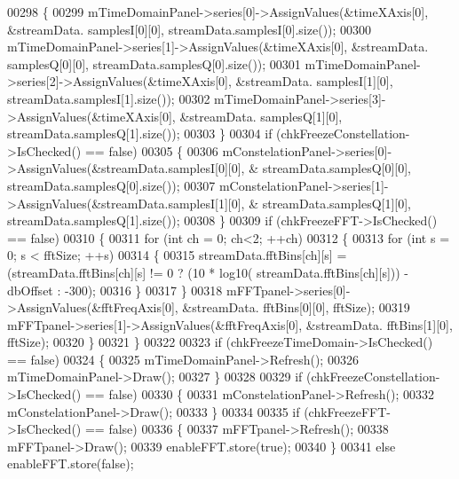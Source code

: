 \begin{DoxyCode}
{{{00298         \{
00299             mTimeDomainPanel->series[0]->AssignValues(&timeXAxis[0], &streamData.
      samplesI[0][0], streamData.samplesI[0].size());
00300             mTimeDomainPanel->series[1]->AssignValues(&timeXAxis[0], &streamData.
      samplesQ[0][0], streamData.samplesQ[0].size());
00301             mTimeDomainPanel->series[2]->AssignValues(&timeXAxis[0], &streamData.
      samplesI[1][0], streamData.samplesI[1].size());
00302             mTimeDomainPanel->series[3]->AssignValues(&timeXAxis[0], &streamData.
      samplesQ[1][0], streamData.samplesQ[1].size());
00303         \}
00304         \textcolor{keywordflow}{if} (chkFreezeConstellation->IsChecked() == \textcolor{keyword}{false})
00305         \{
00306             mConstelationPanel->series[0]->AssignValues(&streamData.samplesI[0][0], &
      streamData.samplesQ[0][0], streamData.samplesQ[0].size());
00307             mConstelationPanel->series[1]->AssignValues(&streamData.samplesI[1][0], &
      streamData.samplesQ[1][0], streamData.samplesQ[1].size());
00308         \}
00309         \textcolor{keywordflow}{if} (chkFreezeFFT->IsChecked() == \textcolor{keyword}{false})
00310         \{
00311             \textcolor{keywordflow}{for} (\textcolor{keywordtype}{int} ch = 0; ch<2; ++ch)
00312             \{
00313                 \textcolor{keywordflow}{for} (\textcolor{keywordtype}{int} s = 0; s < fftSize; ++s)
00314                 \{
00315                     streamData.fftBins[ch][s] = (streamData.fftBins[ch][s] != 0 ? (10 * log10(
      streamData.fftBins[ch][s])) - dbOffset : -300);
00316                 \}
00317             \}
00318             mFFTpanel->series[0]->AssignValues(&fftFreqAxis[0], &streamData.
      fftBins[0][0], fftSize);
00319             mFFTpanel->series[1]->AssignValues(&fftFreqAxis[0], &streamData.
      fftBins[1][0], fftSize);
00320         \}
00321     \}
00322 
00323     \textcolor{keywordflow}{if} (chkFreezeTimeDomain->IsChecked() == \textcolor{keyword}{false})
00324     \{
00325         mTimeDomainPanel->Refresh();
00326         mTimeDomainPanel->Draw();
00327     \}
00328 
00329     \textcolor{keywordflow}{if} (chkFreezeConstellation->IsChecked() == \textcolor{keyword}{false})
00330     \{
00331         mConstelationPanel->Refresh();
00332         mConstelationPanel->Draw();
00333     \}
00334 
00335     \textcolor{keywordflow}{if} (chkFreezeFFT->IsChecked() == \textcolor{keyword}{false})
00336     \{
00337         mFFTpanel->Refresh();
00338         mFFTpanel->Draw();
00339         enableFFT.store(\textcolor{keyword}{true});
00340     \}
00341     \textcolor{keywordflow}{else} enableFFT.store(\textcolor{keyword}{false});
}}}
\end{DoxyCode}
